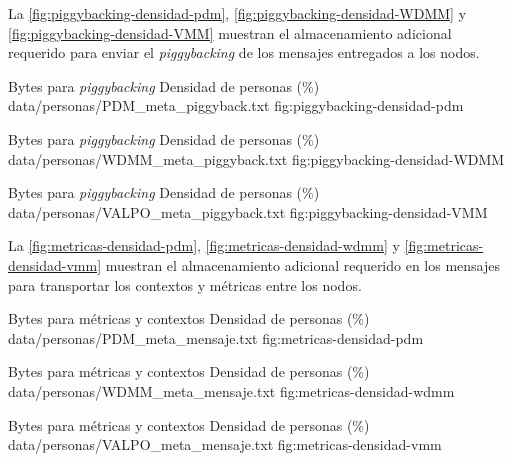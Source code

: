 La \ref{fig:piggybacking-densidad-pdm},
\ref{fig:piggybacking-densidad-WDMM} y
\ref{fig:piggybacking-densidad-VMM} muestran el almacenamiento adicional
requerido para enviar el \textit{piggybacking} de los mensajes entregados a los
nodos.

{
\graficoProtocolo
{Bytes para \textit{piggybacking}}
{Densidad de personas (\%)}
{data/personas/PDM_meta_piggyback.txt}
}{fig:piggybacking-densidad-pdm}

{
\graficoProtocolo
{Bytes para \textit{piggybacking}}
{Densidad de personas (\%)}
{data/personas/WDMM_meta_piggyback.txt}
}{fig:piggybacking-densidad-WDMM}


{
\graficoProtocolo
{Bytes para \textit{piggybacking}}
{Densidad de personas (\%)}
{data/personas/VALPO_meta_piggyback.txt}
}{fig:piggybacking-densidad-VMM}



La \ref{fig:metricas-densidad-pdm}, 
\ref{fig:metricas-densidad-wdmm} y
\ref{fig:metricas-densidad-vmm} muestran el almacenamiento adicional requerido
en los mensajes para transportar los contextos y métricas entre los nodos.

{
\graficoProtocolo
{Bytes para métricas y contextos}
{Densidad de personas (\%)}
{data/personas/PDM_meta_mensaje.txt}
}{fig:metricas-densidad-pdm}

{
\graficoProtocolo
{Bytes para métricas y contextos}
{Densidad de personas (\%)}
{data/personas/WDMM_meta_mensaje.txt}
}{fig:metricas-densidad-wdmm}

{
\graficoProtocolo
{Bytes para métricas y contextos}
{Densidad de personas (\%)}
{data/personas/VALPO_meta_mensaje.txt}
}{fig:metricas-densidad-vmm}




